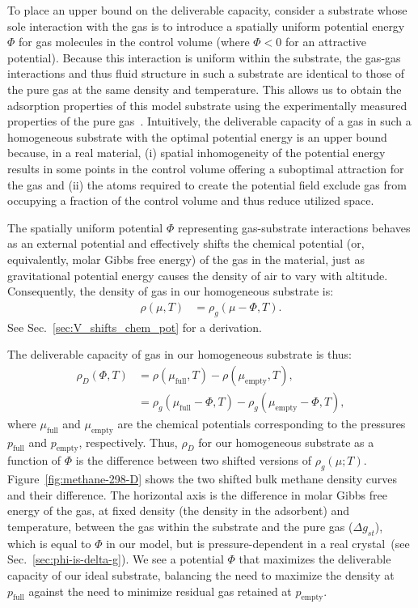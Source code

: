\documentclass[twoside,twocolumn,9pt]{article}
\newcommand\V{\Phi}
\newcommand\pfull{\ensuremath{p_{\text{full}}}}
\newcommand\pempty{\ensuremath{p_{\text{empty}}}}
\newcommand\mufull{\ensuremath{\mu_{\text{full}}}}
\newcommand\muempty{\ensuremath{\mu_{\text{empty}}}}
\newcommand\gst{\ensuremath{\Delta g_{st}}}
\begin{document}
To place an upper bound on the deliverable capacity, consider a substrate whose
sole interaction with the gas is to introduce a spatially uniform potential
energy $\V$ for gas molecules in the control volume (where $\V<0$ for an
attractive potential). Because this interaction is uniform within the
substrate, the gas-gas interactions and thus fluid structure in such a
substrate are identical to those of the pure gas at the same density and
temperature. This allows us to obtain the adsorption properties of this model
substrate using the experimentally measured properties of the pure
gas~\cite{nist}. Intuitively, the deliverable capacity of a gas in such a
homogeneous substrate with the optimal potential energy is an upper bound
because, in a real material, (i) spatial inhomogeneity of the potential
energy results in some points in the control volume offering a suboptimal
attraction for the gas and (ii) the atoms required to create the potential
field exclude gas from occupying a fraction of the control volume and thus reduce utilized space.

The spatially uniform potential $\V$ representing gas-substrate interactions
behaves as an external potential and effectively shifts the chemical potential
(or, equivalently, molar Gibbs free energy) of the gas in the material, just as
gravitational potential energy causes the density of air to vary with altitude.
Consequently, the density of gas in our homogeneous substrate is:
\begin{align}
    \rho(\mu,T) &= \rho_g(\mu - \V,T). \label{eq:mof-density}
\end{align}
See Sec.~\ref{sec:V_shifts_chem_pot} for a derivation.

The deliverable capacity of gas in our homogeneous substrate is thus:
\begin{align}
    \rho_D(\V,T) &= \rho(\mufull,T) - \rho(\muempty,T),
    \label{eq:DofPhi}
    \\
    &= \rho_g(\mufull-\V,T) - \rho_g(\muempty-\V,T),
\end{align}
where $\mufull$ and $\muempty$ are the chemical potentials corresponding to the
pressures $\pfull$ and $\pempty$, respectively. Thus, $\rho_D$ for our
homogeneous substrate as a function of $\V$ is the difference between two
shifted versions of $\rho_g(\mu; T)$. Figure~\ref{fig:methane-298-D} shows the
two shifted bulk methane density curves and their difference. The horizontal
axis is the difference in molar Gibbs free energy of the gas, at fixed density (the density in the adsorbent) and temperature, between the gas within the substrate and the pure gas (\gst),
which is equal to $\V$ in our model, but is pressure-dependent in a real
crystal~(see Sec.~\ref{sec:phi-is-delta-g}). We see a potential $\V$ that
maximizes the deliverable capacity of our ideal substrate, balancing the need
to maximize the density at $\pfull$ against the need to minimize residual gas
retained at $\pempty$.
\end{document}
